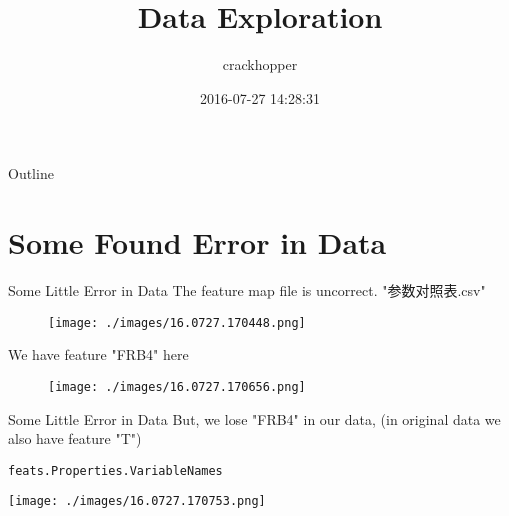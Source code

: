 \documentclass[bigger]{beamer}
\author{crackhopper}
\date{2016-07-27 14:28:31}
\title{Data Exploration}
\begin{document}
\maketitle
\begin{frame}{Outline}
\tableofcontents
\end{frame}


\section{Some Found Error in Data}
\label{sec-1}
\begin{frame}[label=sec-1-1]{Some Little Error in Data}
The feature map file is uncorrect. "参数对照表.csv"
\begin{figure}[htb]
\centering
\texttt{[image: ./images/16.0727.170448.png]}
\end{figure}

We have feature "FRB4" here
\begin{figure}[htb]
\centering
\texttt{[image: ./images/16.0727.170656.png]}
\end{figure}
\end{frame}
\begin{frame}[fragile,label=sec-1-2]{Some Little Error in Data}
 But, we lose "FRB4" in our data, (in original data we also have feature
"T")

\begin{verbatim}
feats.Properties.VariableNames
\end{verbatim}
\texttt{[image: ./images/16.0727.170753.png]}
\end{frame}
\end{document}

